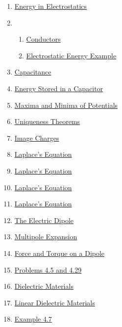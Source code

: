 \documentclass[11pt]{article}
\begin{document}
\begin{multicols}{2}
\begin{enumerate}
		\item \href{https://mp.weixin.qq.com/s/PPA4xbxGSF-Cb0n4frDaYA}{Energy in Electrostatics}	%
		\item 	%
		\begin{enumerate}
			\item \href{https://mp.weixin.qq.com/s/URUFyE97c6ps-v1sGKIP0A}{Conductors}  %
			\item \href{https://mp.weixin.qq.com/s/sQ3qb6BQaSi0YSVkQLT_CQ}{Electrostatic Energy Example}	%
		\end{enumerate}
		\item \href{https://mp.weixin.qq.com/s/A358a4NWxSzl-A4wDW5rgQ}{Capacitance}	%
		\item \href{https://mp.weixin.qq.com/s/LixTxuB72-dPOqJQKWdrBw}{Energy Stored in a Capacitor}	%
		\item \href{https://mp.weixin.qq.com/s/orRXD8-JycixLzCcTgygxg}{Maxima and Minima of Potentials}	%
		\item \href{https://mp.weixin.qq.com/s/6M9MzMudlKlkih-aO4Hv0Q}{Uniqueness Theorems}	%
		\item \href{https://mp.weixin.qq.com/s/AkRfmkRAyy_fm-c7c2Nbfw}{Image Charges}	%
		\item \href{https://mp.weixin.qq.com/s/mrW6TaTPRahTMprRyeG0ZA}{Laplace's Equation }	%
		\item \href{https://mp.weixin.qq.com/s/X_YsCY1QbPXgx5_og1ZLDg}{Laplace's Equation }	%
		\item \href{https://mp.weixin.qq.com/s/c8U0_SeiJbqyszCvALnl-g}{Laplace's Equation }	%
		\item \href{https://mp.weixin.qq.com/s/EzCDJDqpn2P8FHQBMipxgw}{Laplace's Equation }	%
		\item \href{https://mp.weixin.qq.com/s/NOqnV4E4daft0EYD8jUxdA}{The Electric Dipole}	%
		\item \href{https://mp.weixin.qq.com/s/5KImbZpTgNP6qrTXdqDLuQ}{Multipole Expansion}	%
		\item \href{https://mp.weixin.qq.com/s/93654RyiDqpNc2zV0hem8g}{Force and Torque on a Dipole}	%
		\item \href{https://mp.weixin.qq.com/s/JY5Avd-cQwrLmOp2aYTwrg}{Problems 4.5 and 4.29}	%
		\item \href{https://mp.weixin.qq.com/s/CDIfNObup4UAKSjTyKT8Xg}{Dielectric Materials}	%
		\item \href{https://mp.weixin.qq.com/s/YDmiKhaZp2Xh949AuonZ_A}{Linear Dielectric Materials}	%
		\item \href{https://mp.weixin.qq.com/s/HawDYMNTAzoQEpVFGIjWYQ}{Example 4.7}	%

\end{enumerate}
\end{multicols}
\end{document}
